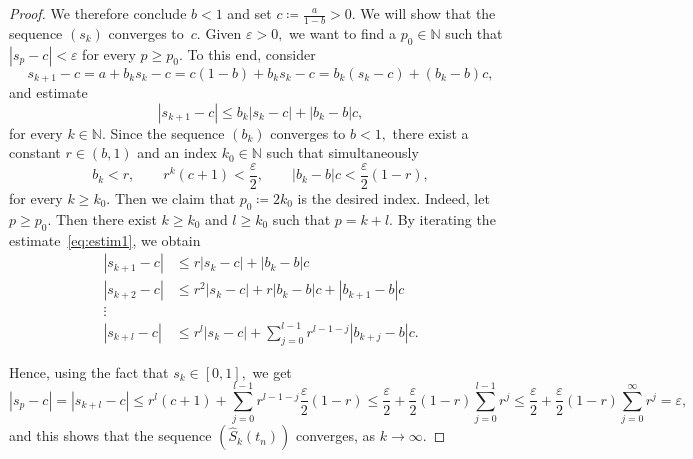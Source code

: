 \documentclass[10pt,a4paper]{amsart}
\def\as{\coloneqq}
\def\eps{\varepsilon}
\renewcommand{\hat}{\widehat}
\newcommand{\hlf}[1]{\frac{#1}{2}}
\def\l{\left}
\def\nat{\mathbb{N}}
\def\r{\right}
\begin{document}
\begin{proof}
We therefore conclude $b<1$ and set $c\as\frac{a}{1-b}>0.$ We will show that the sequence $\l(s_k\r)$ converges to~$c.$ Given $\eps>0,$ we want to find a $p_0\in\nat$ such that $\l|s_p-c \r|<\eps$ for every $p\ge p_0.$ To this end, consider
\begin{equation*}
 s_{k+1}-c = a + b_k s_k - c = c(1-b) + b_k s_k - c = b_k\l(s_k-c\r) + \l(b_k-b\r)c, 
 \end{equation*}
 and estimate
 \begin{equation} \label{eq:estim1}
 \l|s_{k+1}-c \r| \le b_k \l|s_k-c\r| + \l|b_k-b\r|c, 
\end{equation}
for every $k \in\nat.$ Since the sequence $\l(b_k\r)$ converges to $b<1,$ there exist a constant $r\in (b,1)$ and an index $k_0\in\nat$ such that simultaneously 
\begin{equation*}
b_k<r,\qquad r^k(c+1)<\hlf{\eps},\qquad \l|b_k-b\r|c<\hlf{\eps}(1-r),
\end{equation*}
for every $k\ge k_0.$ Then we claim that $p_0\as 2k_0$ is the desired index. Indeed, let $p\ge p_0.$ Then there exist $k\ge k_0$ and $l\ge k_0$ such that $p=k+l.$ By iterating the estimate~\eqref{eq:estim1}, we obtain
\begin{align*}
 \l|s_{k+1}-c \r| & \le r \l|s_k-c\r| + \l|b_k-b\r|c \\ \l|s_{k+2}-c \r| & \le r^2 \l|s_k-c\r| + r \l|b_k-b\r|c + \l|b_{k+1}-b\r|c \\ \vdots \\
 \l|s_{k+l}-c \r| & \le r^l \l|s_k-c\r| + \sum_{j=0}^{l-1} r^{l-1-j}\l|b_{k+j}-b\r|c.
\end{align*}

Hence, using the fact that $s_k \in [0,1],$ we get
\begin{equation*}
 \l|s_p -c \r| = \l|s_{k+l}-c \r| \le r^l (c+1) +\sum_{j=0}^{l-1} r^{l-1-j}\hlf{\eps}(1-r) \le\hlf{\eps} + \hlf{\eps}(1-r) \sum_{j=0}^{l-1} r^j \le\hlf{\eps} + \hlf{\eps}(1-r) \sum_{j=0}^\infty r^j =\eps,
\end{equation*}
and this shows that the sequence $\l(\hat{S}_k\l(t_n\r)\r)$ converges, as $k\to\infty.$


\end{proof}
\end{document}
